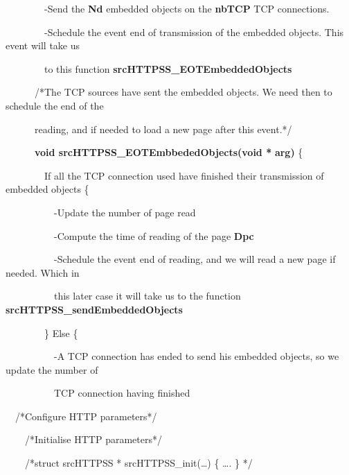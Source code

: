 \documentclass[a4paper]{article}
\begin{document}
{
\ \ \ \ \ \ \ \ {}-Send the \textbf{Nd }embedded objects on the \textbf{nbTCP }TCP connections.}

{
\ \ \ \ \ \ \ \ {}-Schedule the event end of transmission of the embedded objects. This event will take us}

{
\ \ \ \ \ \ \ \ to this function \textbf{srcHTTPSS\_EOTEmbeddedObjects}}

\bigskip

{
\ \ \ \ \ \ /*The TCP sources have sent the embedded objects. We need then to schedule the end of the}

{
\ \ \ \ \ \ reading, and if needed to load a new page after this event.*/}

\bigskip

{
\ \ \ \ \ \ \textbf{void srcHTTPSS\_EOTEmbbededObjects(}\textbf{void *}\textbf{ arg)} \{}

{
\ \ \ \ \ \ \ \ If all the TCP connection used have finished their transmission of embedded objects \{}

{
\ \ \ \ \ \ \ \ \ \ {}-Update the number of page read}

{
\ \ \ \ \ \ \ \ \ \ {}-Compute the time of reading of the page \textbf{Dpc}}

{
\ \ \ \ \ \ \ \ \ \ {}-Schedule the event end of reading, and we will read a new page if needed. Which in}

{
\ \ \ \ \ \ \ \ \ \ this later case it will take us to the function \textbf{srcHTTPSS\_sendEmbeddedObjects}}

{
\ \ \ \ \ \ \ \ \} Else \{}

{
\ \ \ \ \ \ \ \ \ \ {}-A TCP connection has ended to send his embedded objects, so we update the number of}


{
\ \ \ \ \ \ \ \ \ \ TCP connection having finished}

\pagebreak


{
\ \ /*Configure HTTP parameters*/}

{
\ \ \ \ /*Initialise HTTP parameters*/}

{
\ \ \ \ /*struct srcHTTPSS * srcHTTPSS\_init({\dots}) \{ {\dots}. \} */}
\end{document}
